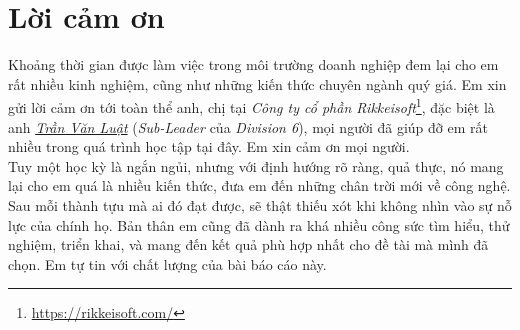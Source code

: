 \section*{
    \centering
    Lời cảm ơn
    \vspace{1.25cm}
}

Khoảng thời gian được làm việc trong môi trường doanh nghiệp đem lại cho em rất nhiều kinh nghiệm, cũng như những kiến thức chuyên ngành quý giá. Em xin gửi lời cảm ơn tới toàn thể anh, chị tại \textit{Công ty cổ phần Rikkeisoft}\footnote{\href{https://rikkeisoft.com/}{https://rikkeisoft.com/}}, đặc biệt là anh \href{mailto:luattv@rikkeisoft.com}{\textit{Trần Văn Luật}} (\textit{Sub-Leader} của \textit{Division 6}), mọi người đã giúp đỡ em rất nhiều trong quá trình học tập tại đây. Em xin cảm ơn mọi người.\\

Tuy một học kỳ là ngắn ngủi, nhưng với định hướng rõ ràng, quả thực, nó mang lại cho em quá là nhiều kiến thức, đưa em đến những chân trời mới về công nghệ. Sau mỗi thành tựu mà ai đó đạt được, sẽ thật thiếu xót khi không nhìn vào sự nỗ lực của chính họ. Bản thân em cũng đã dành ra khá nhiều công sức tìm hiểu, thử nghiệm, triển khai, và mang đến kết quả phù hợp nhất cho đề tài mà mình đã chọn. Em tự tin với chất lượng của bài báo cáo này.\\